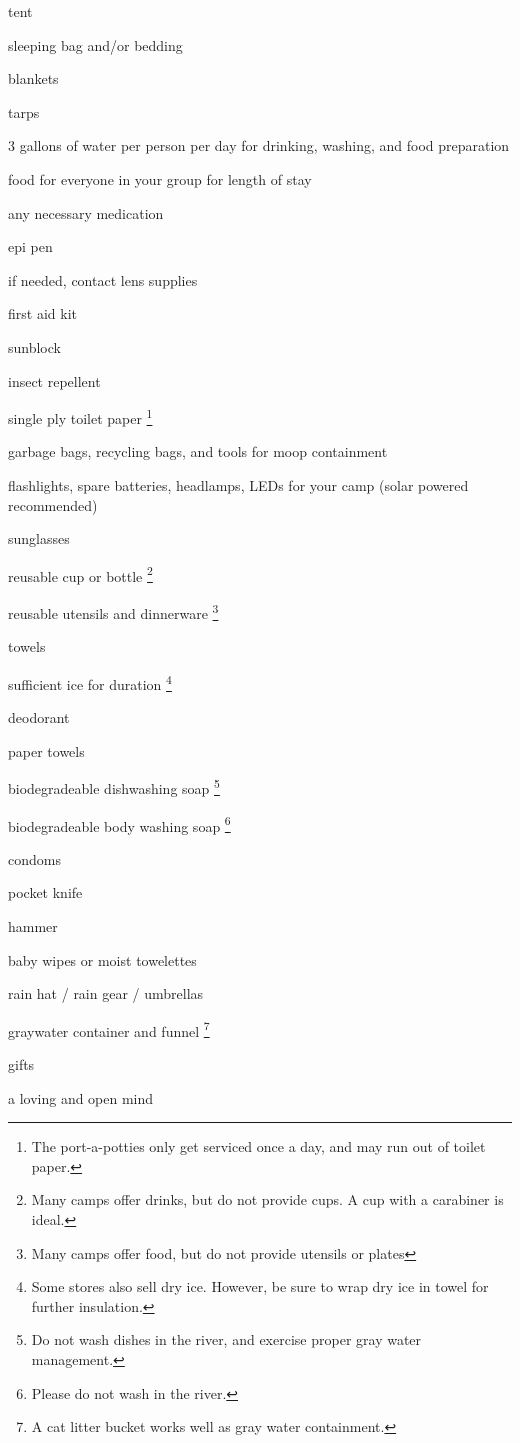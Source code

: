\begin{multicols}{2}

\begin{checklist}
	\item tent
    \item sleeping bag and/or bedding
    \item blankets
    \item tarps
    \item 3 gallons of water per person per day for drinking, washing, and food preparation
    \item food for everyone in your group for length of stay
    \item any necessary medication
    \item epi pen
    \item if needed, contact lens supplies
    \item first aid kit
    \item sunblock
    \item insect repellent
    \item single ply toilet paper \footnote{The port-a-potties only get serviced once a day, and may run out of toilet paper.}
    \item garbage bags, recycling bags, and tools for \gls{moop} containment
    \item flashlights, spare batteries, headlamps, LEDs for your camp  (solar powered recommended) 
    \item sunglasses
    \item reusable cup or bottle \footnote{Many camps offer drinks, but do not provide cups.  A cup with a carabiner is ideal.}
    \item reusable utensils and dinnerware \footnote{Many camps offer food, but do not provide utensils or plates}
    \item towels
    \item sufficient ice for duration \footnote{Some stores also sell dry ice. However, be sure to wrap dry ice in towel for further insulation.}
    \item deodorant
    \item paper towels
    \item biodegradeable dishwashing soap \footnote{Do not wash dishes in the river, and exercise proper gray water management.}
    \item biodegradeable body washing soap \footnote{Please do not wash in the river.}
    \item condoms
    \item pocket knife
    \item hammer
    \item baby wipes or moist towelettes
    \item rain hat / rain gear / umbrellas
    \item \gls{graywater} container and funnel \footnote{A cat litter bucket works well as gray water containment.}
    \item gifts
    \item a loving and open mind
    \item \hrulefill
\end{checklist}


\end{multicols}

